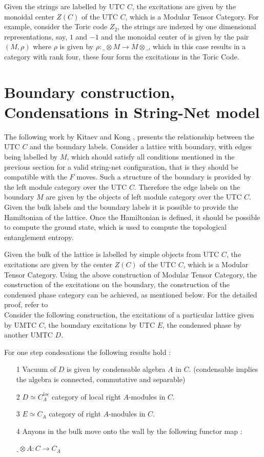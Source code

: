 Given the strings are labelled by UTC $C$, the excitations are given by the monoidal center $Z(C)$ of the UTC $C$, which is a Modular Tensor Category. For example,
consider the Toric code $Z_{2}$, the strings are indexed by one dimensional representations, say, $1$ and $-1$ and the monoidal center of is given by the pair
$(M, \rho)$ where $\rho$ is given by $\rho : \_ \otimes M \rightarrow M \otimes \_ $, which in this case results in a category with rank four, these four form
the excitations in the Toric Code.

\section{Boundary construction, Condensations in String-Net model}

The following work by Kitaev and Kong \citep{Reference4}, presents the relationship between the UTC $C$ and the boundary labels. Consider a lattice with boundary, with edges being labelled
by $M$, which should satisfy all conditions mentioned in the previous section for a valid string-net configuration, that is they should be compatible with the $F$ moves.
Such a structure of the boundary is provided by the left module category over the UTC $C$. Therefore the edge labels on the boundary $M$ are given by the objects of left module category
over the UTC $C$. Given the bulk labels and the boundary labels it is possible to provide the Hamiltonian of the lattice. Once the Hamiltonian is defined, it should be possible 
to compute the ground state, which is used to compute the topological entanglement entropy.

Given the bulk of the lattice is labelled by simple objects from UTC $C$, the excitations are given by the center $Z(C)$ of the UTC $C$, which is a Modular Tensor Category.  
Using the above construction of Modular Tensor Category, the construction of the excitations  on the boundary, the construction of the condensed phase category can be achieved,
as mentioned below. For the detailed proof, refer to \citep{Reference5} \\

Consider the following construction, the excitations of a particular lattice given by UMTC $C$, the boundary excitations by UTC $E$, the condensed phase by another UMTC $D$. 

For one step condesations the following results hold :\\
\begin{itemize}
\item[1] Vacuum of $D$ is given by condensable algebra $A$ in $C$. (condensable implies the algebra is connected, commutative and separable) 
\item[2] $D \simeq C_{A}^{loc}$ category of local right $A$-modules in $C$. 
\item[3] $E \simeq C_{A}$ category of right $A$-modules in $C$. 
\item[4] Anyons in the bulk move onto the wall by the following functor map : 
\begin{center}
  $ \_ \otimes A : C \rightarrow  C_{A}$
\end{center}
\end{itemize}

